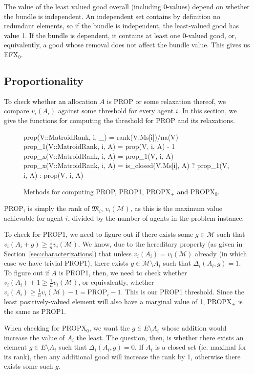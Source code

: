 The value of the least valued good overall (including 0-values) depend on whether the bundle is independent. An independent set contains by definition no redundant elements, so if the bundle is independent, the least-valued good has value 1. If the bundle is dependent, it contains at least one 0-valued good, or, equivalently, a good whose removal does not affect the bundle value. This gives us EFX$_0$.

\subsection*{Proportionality}
To check whether an allocation $A$ is PROP or some relaxation thereof, we compare $v_i(A_i)$ against some threshold for every agent $i$. In this section, we give the functions for computing the threshold for PROP and its relaxations.

\begin{figure}[ht!]
\begin{jllisting}
prop(V::MatroidRank, i, _) = rank(V.Ms[i])/na(V)
prop_1(V::MatroidRank, i, A) = prop(V, i, A) - 1
prop_x(V::MatroidRank, i, A) = prop_1(V, i, A)
prop_x(V::MatroidRank, i, A) = 
    is_closed(V.Ms[i], A) ? prop_1(V, i, A) : prop(V, i, A)
\end{jllisting}
\caption{Methods for computing PROP, PROP1, PROPX$_+$ and PROPX$_0$.}
\end{figure}

PROP$_i$ is simply the rank of $\mathfrak{M}_i$, $v_i(\mathcal{M})$, as this is the maximum value achievable for agent $i$, divided by the number of agents in the problem instance.

To check for PROP1, we need to figure out if there exists some $g\in\mathcal{M}$ such that $v_i(A_i+g)\geq \frac{1}{n}v_i(\mathcal{M})$. We know, due to the hereditary property (as given in Section~\ref{sec:characterizations}) that unless $v_i(A_i) = v_i(\mathcal{M})$ already (in which case we have trivial PROP1), there exists $g\in\mathcal{M}\setminus A_i$ such that $\Delta_i(A_i, g) = 1$. To figure out if $A$ is PROP1, then, we need to check whether $v_i(A_i) + 1 \geq \frac{1}{n}v_i(\mathcal{M})$, or equivalently, whether $v_i(A_i) \geq \frac{1}{n}v_i(\mathcal{M})-1 = \text{PROP}_i - 1$. This is our PROP1 threshold. Since the least positively-valued element will also have a marginal value of 1, PROPX$_+$ is the same as PROP1.

When checking for PROPX$_0$, we want the $g\in E\setminus A_i$ whose addition would increase the value of $A_i$ the least. The question, then, is whether there exists an element $g\in E\setminus A_i$ such that $\Delta_i(A_i, g) = 0$. If $A_i$ is a closed set (ie. maximal for its rank), then any additional good will increase the rank by 1, otherwise there exists some such $g$.

